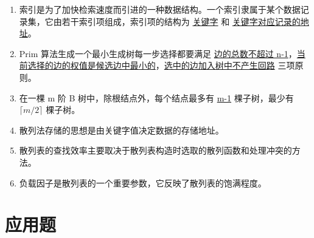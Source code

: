 \documentclass[12pt, a4paper]{article}
\begin{document}
\begin{enumerate}
	\item 索引是为了加快检索速度而引进的一种数据结构。一个索引隶属于某个数据记录集，它由若干索引项组成，索引项的结构为 \underline{关键字} 和 \underline{关键字对应记录的地址}。
	\item Prim 算法生成一个最小生成树每一步选择都要满足 \underline{边的总数不超过 n-1}，\underline{当前选择的边的权值是候选边中最小的}，\underline{选中的边加入树中不产生回路} 三项原则。
	\item 在一棵 m 阶 B 树中，除根结点外，每个结点最多有 \underline{m-1} 棵子树，最少有 \underline{$\lceil m/2 \rceil$} 棵子树。
	\item 散列法存储的思想是由关键字值决定数据的存储地址。
	\item 散列表的查找效率主要取决于散列表构造时选取的散列函数和处理冲突的方法。
	\item 负载因子是散列表的一个重要参数，它反映了散列表的饱满程度。
\end{enumerate}

\section*{应用题}
\end{document}
